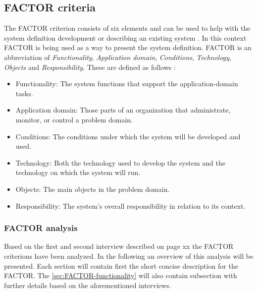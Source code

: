 \subsection{FACTOR criteria} \label{sec:factorcriteria}
The FACTOR criterion consists of six elements and can be used to help with the system definition development or describing an existing system
. 
In this context FACTOR is being used as a way to present the system definition.
FACTOR is an abbreviation of \textit{Functionality}, \textit{Application domain}, \textit{Conditions}, \textit{Technology}, \textit{Objects} and \textit{Responsibility}.
These are defined as follows \citep[p.~40]{Rod-Aalborg}:
\begin{itemize}
	\item
	 Functionality: 
	 The system functions that support the application-domain tasks.
	\item
	 Application domain: 
	 Those parts of an organization that administrate, monitor, or control a problem domain.
	\item
	 Conditions: 
	 The conditions under which the system will be developed and used.
	\item
	 Technology: 
	 Both the technology used to develop the system and the technology on which the system will run.
	\item
	 Objects: 
	 The main objects in the problem domain.
	\item
	 Responsibility: 
	 The system’s overall responsibility in relation to its context.
\end{itemize}

\subsubsection{FACTOR analysis}
Based on the first and second interview described on page xx the FACTOR criterions have been analyzed. 
In the following an overview of this analysis will be presented.
Each section will contain first the short concise description for the FACTOR. 
The \cref{sec:FACTOR-functionality} will also contain subsection with further details based on the aforementioned interviews. 

